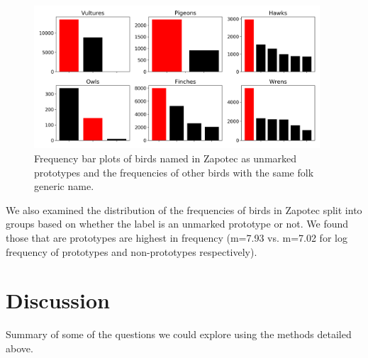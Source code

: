 \documentclass[10pt,letterpaper]{article}
\begin{document}
\begin{figure}[ht!]
  \begin{center}
    \includegraphics[width=0.95\textwidth]{./figures/prototypes-barplots-all.png}
        \caption{Frequency bar plots of birds named in Zapotec as unmarked prototypes and the frequencies of other birds with the same folk generic name.}
        \label{fig-freq-prototype-all}
  \end{center}
\end{figure}


We also examined the distribution of the frequencies of birds in Zapotec split into groups based on whether the label is an unmarked prototype or not. We found those that are prototypes are highest in frequency (m=7.93 vs. m=7.02 for log frequency of prototypes and non-prototypes respectively).








\section{Discussion}

Summary of some of the questions we could explore using the methods detailed above.
\end{document}
